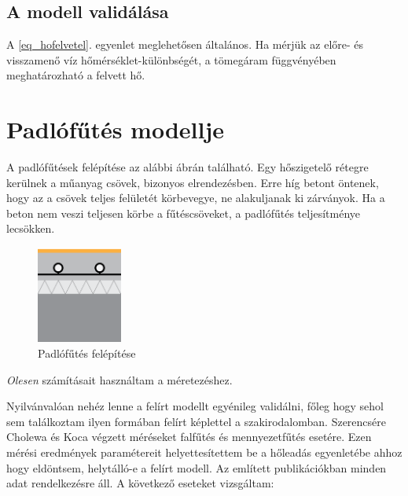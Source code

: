 \subsection{A modell validálása}

A \ref{eq_hofelvetel}. egyenlet meglehetősen általános. Ha mérjük az előre- és visszamenő víz hőmérséklet-különbségét, a tömegáram függvényében meghatározható a felvett hő.


\section{Padlófűtés modellje}

A padlófűtések felépítése az alábbi ábrán található. Egy hőszigetelő rétegre kerülnek a műanyag csövek, bizonyos elrendezésben. Erre híg betont öntenek, hogy az a csövek teljes felületét körbevegye, ne alakuljanak ki zárványok. Ha a beton nem veszi teljesen körbe a fűtéscsöveket, a padlófűtés teljesítménye lecsökken.

\begin{figure}[H]
	\centering
	\includegraphics[trim=0 0 0 0, clip,width=0.25\textwidth]{figures/ISO11855typeA}
	\caption{Padlófűtés felépítése}
	\label{fig:futotest-padlofutes}
\end{figure}

\textit{Olesen} számításait használtam a méretezéshez.
 

Nyilvánvalóan nehéz lenne a felírt modellt egyénileg validálni, főleg hogy sehol sem találkoztam ilyen formában felírt képlettel a szakirodalomban. Szerencsére Cholewa \cite{CHOLEWA2013599} és Koca \cite{Koca} végzett méréseket falfűtés és mennyezetfűtés esetére. Ezen mérési eredmények paramétereit helyettesítettem be a hőleadás egyenletébe ahhoz hogy eldöntsem, helytálló-e a felírt modell. Az említett publikációkban minden adat rendelkezésre áll. A következő eseteket vizsgáltam:

